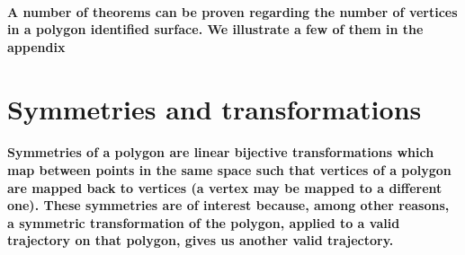 \documentclass{report}
\begin{document}
\paragraph{A number of theorems can be proven regarding the number of vertices in a polygon identified surface. We illustrate a few of them in the appendix}


\section{Symmetries and transformations}

\paragraph{Symmetries of a polygon are linear bijective transformations which map between points in the same space such that vertices of a polygon are mapped back to vertices (a vertex may be mapped to a different one). 
These symmetries are of interest because, among other reasons, a symmetric transformation of the polygon, applied to a valid trajectory on that polygon, gives us another valid trajectory.}
\end{document}
